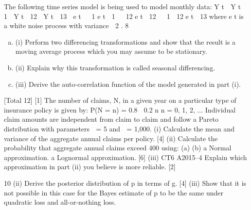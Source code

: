 \documentclass[a4paper,12pt]{article}
\begin{document}
\begin{enumerate}

The following time series model is being used to model monthly data:
Y t  Y t  1  Y t  12  Y t  13  e t   1 e t  1   12 e t  12   1  12 e t  13
where e t is a white noise process with variance  2 .
8
\begin{enumerate}[(a)]
\item (i) Perform two differencing transformations and show that the result is a moving
average process which you may assume to be stationary.
\item (ii) Explain why this transformation is called seasonal differencing.
\item (iii) Derive the auto-correlation function of the model generated in part (i).
\end{enumerate}

\newpage


[Total 12]
[1]
The number of claims, N, in a given year on a particular type of insurance policy is
given by:
P(N = n) = 0.8  0.2 n
n = 0, 1, 2, ...
Individual claim amounts are independent from claim to claim and follow a Pareto
distribution with parameters  = 5 and  = 1,000.
(i) Calculate the mean and variance of the aggregate annual claims per policy. [4]
(ii) Calculate the probability that aggregate annual claims exceed 400 using:
(a)
(b)
a Normal approximation.
a Lognormal approximation.
[6]
(iii)
CT6 A2015–4
Explain which approximation in part (ii) you believe is more reliable.
[2]

10
(ii) Derive the posterior distribution of p in terms of g.
[4]
(iii) Show that it is not possible in this case for the Bayes estimate of p to be the
same under quadratic loss and all-or-nothing loss.


\newpage


\end{enumerate}
\end{document}
